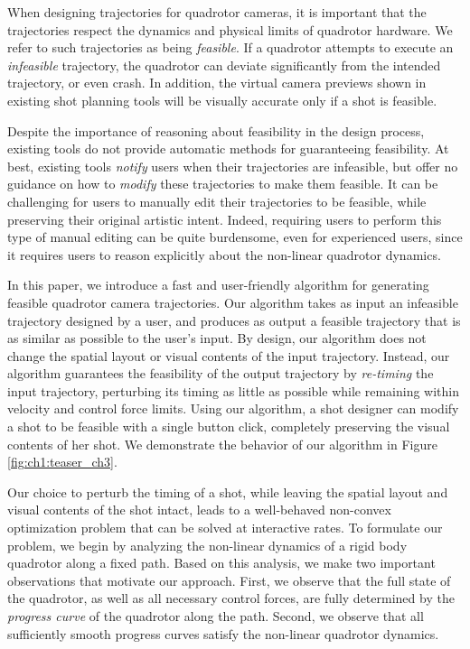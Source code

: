 
\label{sec:ch3}

When designing trajectories for quadrotor cameras, it is important that the  trajectories respect the dynamics and physical limits of quadrotor hardware.
We refer to such trajectories as being \emph{feasible}.
If a quadrotor attempts to execute an \emph{infeasible}  trajectory, 
the quadrotor can deviate significantly from the intended trajectory, or even crash.
In addition, the virtual camera previews shown in existing shot planning tools will be visually accurate only if a shot is feasible.

Despite the importance of reasoning about feasibility in the design process, existing tools do not provide automatic methods for guaranteeing feasibility.
At best, existing tools \emph{notify} users when their trajectories are infeasible, but offer no guidance on how to \emph{modify} these trajectories to make them feasible.
It can be challenging for users to manually edit their trajectories to be feasible,  while preserving their original artistic intent. Indeed, requiring users to perform this type of manual editing can be quite burdensome, even for experienced users, since it requires users to reason explicitly about the non-linear quadrotor dynamics.

In this paper, we introduce a fast and user-friendly algorithm for generating feasible quadrotor camera trajectories.
Our algorithm takes as input an infeasible trajectory designed by a user, and produces as output a feasible trajectory that is as similar as possible to the user's input.
By design, our algorithm does not change the spatial layout or  visual contents of the input trajectory.
Instead, our algorithm guarantees the feasibility of the output trajectory by \emph{re-timing} the input trajectory, perturbing its timing as little as possible while remaining within velocity and control force limits.
Using our algorithm, a shot designer can modify a shot to be feasible with a single button click, completely preserving the visual contents of her shot.
We demonstrate the behavior of our algorithm in Figure \ref{fig:ch1:teaser_ch3}.

Our choice to perturb the timing of a shot, while leaving the spatial layout and visual contents of the shot intact, leads to a well-behaved non-convex optimization problem that can be solved at interactive rates.
To formulate our problem, we begin by analyzing the non-linear dynamics of a rigid body quadrotor along a fixed path.
Based on this analysis, we make two important observations that motivate our approach.
First, we observe that the full state of the quadrotor, as well as all necessary control forces, are fully determined by the \emph{progress curve} of the quadrotor along the path.
Second, we observe that all sufficiently smooth progress curves satisfy the non-linear quadrotor dynamics.

